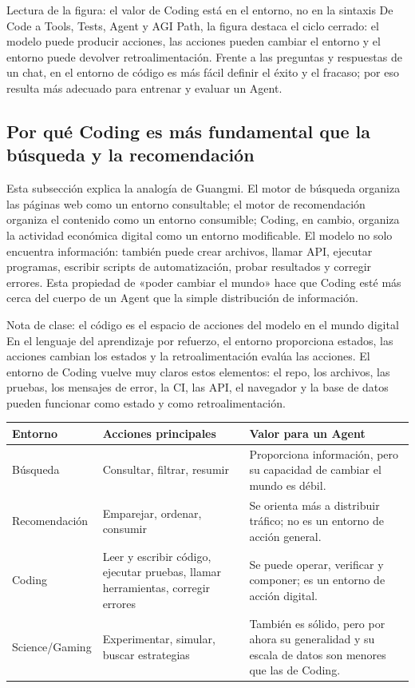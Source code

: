 \documentclass[a4paper]{article}
\begin{document}
\begin{knowledgebox}{Lectura de la figura: el valor de Coding está en el entorno, no en la sintaxis}
De Code a Tools, Tests, Agent y AGI Path, la figura destaca el ciclo cerrado: el modelo puede producir acciones, las acciones pueden cambiar el entorno y el entorno puede devolver retroalimentación. Frente a las preguntas y respuestas de un chat, en el entorno de código es más fácil definir el éxito y el fracaso; por eso resulta más adecuado para entrenar y evaluar un Agent.
\end{knowledgebox}

\subsection{Por qué Coding es más fundamental que la búsqueda y la recomendación}

Esta subsección explica la analogía de Guangmi. El motor de búsqueda organiza las páginas web como un entorno consultable; el motor de recomendación organiza el contenido como un entorno consumible; Coding, en cambio, organiza la actividad económica digital como un entorno modificable. El modelo no solo encuentra información: también puede crear archivos, llamar API, ejecutar programas, escribir scripts de automatización, probar resultados y corregir errores. Esta propiedad de «poder cambiar el mundo» hace que Coding esté más cerca del cuerpo de un Agent que la simple distribución de información.

\begin{knowledgebox}{Nota de clase: el código es el espacio de acciones del modelo en el mundo digital}
En el lenguaje del aprendizaje por refuerzo, el entorno proporciona estados, las acciones cambian los estados y la retroalimentación evalúa las acciones. El entorno de Coding vuelve muy claros estos elementos: el repo, los archivos, las pruebas, los mensajes de error, la CI, las API, el navegador y la base de datos pueden funcionar como estado y como retroalimentación.
\end{knowledgebox}

\noindent\begin{tabularx}{\textwidth}{p{}p{}X}
\toprule
Entorno & Acciones principales & Valor para un Agent \\
\midrule
Búsqueda & Consultar, filtrar, resumir & Proporciona información, pero su capacidad de cambiar el mundo es débil. \\
Recomendación & Emparejar, ordenar, consumir & Se orienta más a distribuir tráfico; no es un entorno de acción general. \\
Coding & Leer y escribir código, ejecutar pruebas, llamar herramientas, corregir errores & Se puede operar, verificar y componer; es un entorno de acción digital. \\
Science/Gaming & Experimentar, simular, buscar estrategias & También es sólido, pero por ahora su generalidad y su escala de datos son menores que las de Coding. \\
\bottomrule
\end{tabularx}
\end{document}
